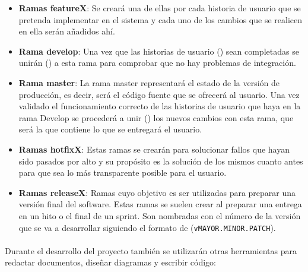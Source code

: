 \documentclass{article}
\begin{document}
            \begin{itemize}

				\item \textbf{Ramas featureX}: Se creará una de ellas por cada historia de usuario que se pretenda implementar en el sistema y cada uno de los cambios que se realicen en ella serán añadidos ahí. 

           		\item \textbf{Rama develop}: Una vez que las historias de usuario () sean completadas se unirán () a esta rama para comprobar que no hay problemas de integración.

        		\item \textbf{Rama master}: La rama master representará el estado de la versión de producción, es decir, será el código fuente que se ofrecerá al usuario. Una vez validado el funcionamiento correcto de las historias de usuario que haya en la rama Develop se procederá a unir () los nuevos cambios con esta rama, que será la que contiene lo que se entregará el usuario.  


				\item \textbf{Ramas hotfixX}: Estas ramas se crearán para solucionar fallos que hayan sido pasados por alto y su propósito es la solución de los mismos cuanto antes para que sea lo más transparente posible para el usuario. 


				\item \textbf{Ramas releaseX}: Ramas cuyo objetivo es ser utilizadas para preparar una versión final del software. Estas ramas se suelen crear al preparar una entrega en un hito o el final de un sprint. Son nombradas con el número de la versión que se va a desarrollar siguiendo el formato de \cite{semver:semantic-versioning}(\texttt{vMAYOR.MINOR.PATCH}).
                
			\end{itemize}
            
            \paragraph{}
            Durante el desarrollo del proyecto también se utilizarán otras herramientas para redactar documentos, diseñar diagramas y escribir código:
\end{document}
